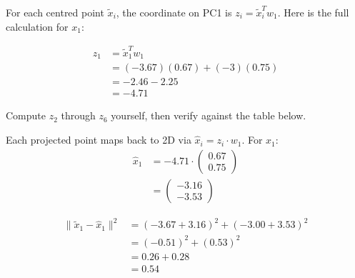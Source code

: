 \newpage
{} For each centred point $\tilde{x}_i$, the coordinate on PC1 is $z_i = \tilde{x}_i^T w_1$.
Here is the full calculation for $x_1$:

\begin{align*}
    z_1 &= \tilde{x}_1^T w_1 \\
        &= (-3.67)(0.67) + (-3)(0.75) \\
        &= -2.46 - 2.25 \\
        &= -4.71
\end{align*}

Compute $z_2$ through $z_6$ yourself, then verify against the table below.

 Each projected point maps back to 2D via $\hat{x}_i = z_i \cdot w_1$.
For $x_1$:
\begin{align*}
    \hat{x}_1 &= -4.71 \cdot \begin{pmatrix} 0.67 \\ 0.75 \end{pmatrix} \\
              &= \begin{pmatrix} -3.16 \\ -3.53 \end{pmatrix}
\end{align*}

\begin{align*}
    \|\tilde{x}_1 - \hat{x}_1\|^2 &= (-3.67 + 3.16)^2 + (-3.00 + 3.53)^2 \\
                                    &= (-0.51)^2 + (0.53)^2 \\
                                    &= 0.26 + 0.28 \\
                                    &= 0.54
\end{align*}

